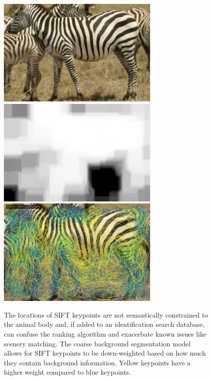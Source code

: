 \begin{figure}[!t]
    \begin{center}
        \includegraphics[width=0.32\linewidth]{resources/background-input.pdf}
        \includegraphics[width=0.32\linewidth]{resources/background-weights.pdf}
        \includegraphics[width=0.32\linewidth]{resources/background-sift.pdf}
    \end{center}
    \caption{The locations of SIFT keypoints are not semantically constrained to the animal body and, if added to an identification search database, can confuse the ranking algorithm and exacerbate known issues like scenery matching.  The coarse background segmentation model allows for SIFT keypoints to be down-weighted based on how much they contain background information.  Yellow keypoints have a higher weight compared to blue keypoints.}
    \label{fig:weighting}
\end{figure}

